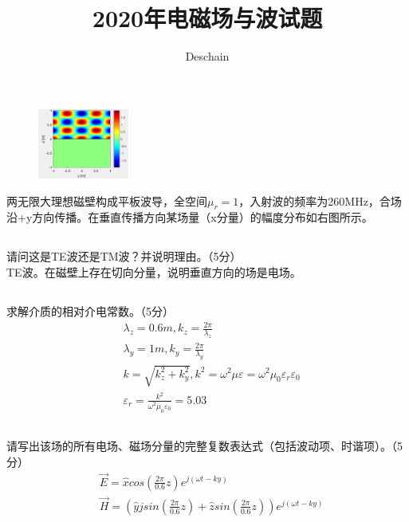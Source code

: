 \documentclass[UTF8]{ctexart}
\title{2020年电磁场与波试题}
\author{Deschain}
\begin{document}
\maketitle
\section{}
\begin{figure}
\includegraphics[width=3cm]{2020-1.png}
\end{figure}
两无限大理想磁壁构成平板波导，全空间$\mu_r=1$，入射波的频率为260MHz，合场沿+y方向传播。在垂直传播方向某场量（x分量）的幅度分布如右图所示。
\subsection{}
请问这是TE波还是TM波？并说明理由。（5分）\\
TE波。在磁壁上存在切向分量，说明垂直方向的场是电场。
\subsection{}
求解介质的相对介电常数。（5分）
\begin{equation*}
\begin{aligned}
&\lambda_z=0.6m,k_z=\frac{2\pi}{\lambda_z}\\
&\lambda_y=1m,k_y=\frac{2\pi}{\lambda_y}\\
&k=\sqrt{k_z^2 + k_y^2},k^2=\omega^2\mu \varepsilon=\omega^2\mu_0\varepsilon_r\varepsilon_0\\
&\varepsilon_r=\frac{k^2}{\omega^2\mu_0\varepsilon_0}=5.03
\end{aligned}
\end{equation*}
\subsection{}
请写出该场的所有电场、磁场分量的完整复数表达式（包括波动项、时谐项）。（5分）
\begin{equation*}
\begin{aligned}
&\vec E=\hat xcos(\frac{2\pi}{0.6}z)e^{j(\omega t-ky)}\\
&\vec H=(\hat yjsin(\frac{2\pi}{0.6}z)+\hat zsin(\frac{2\pi}{0.6}z))e^{j(\omega t-ky)}
\end{aligned}
\end{equation*}
\end{document}
